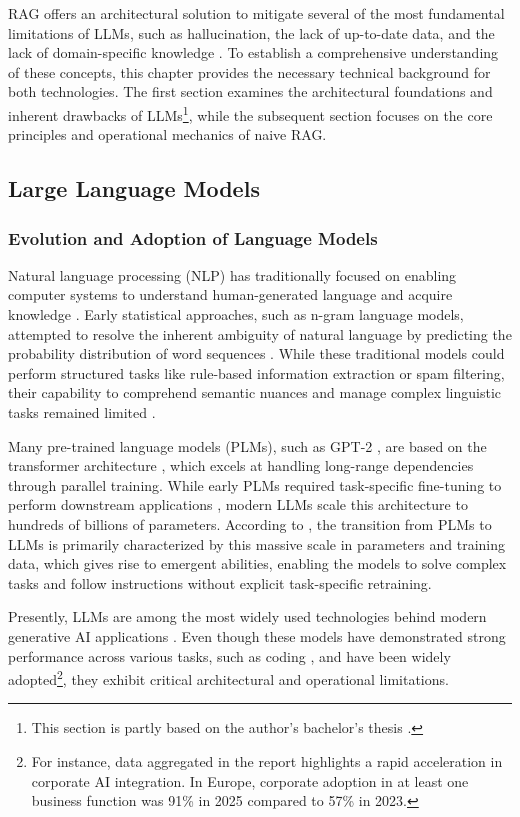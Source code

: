 RAG offers an architectural solution to mitigate several of the most fundamental limitations of LLMs, such as hallucination, the lack of up-to-date data, and the lack of domain-specific knowledge \citep{wu2025ragnlp}. To establish a comprehensive understanding of these concepts, this chapter provides the necessary technical background for both technologies. The first section examines the architectural foundations and inherent drawbacks of LLMs\footnote{This section is partly based on the author's bachelor's thesis \citep{asunmaa2025large}.}, while the subsequent section focuses on the core principles and operational mechanics of naive RAG.

\subsection{Large Language Models}
\label{chapter:LLM}

\subsubsection{Evolution and Adoption of Language Models}
Natural language processing (NLP) has traditionally focused on enabling computer systems to understand human-generated language and acquire knowledge \citep{RussellNorvig2010}. Early statistical approaches, such as n-gram language models, attempted to resolve the inherent ambiguity of natural language by predicting the probability distribution of word sequences \citep{RussellNorvig2010}. While these traditional models could perform structured tasks like rule-based information extraction or spam filtering, their capability to comprehend semantic nuances and manage complex linguistic tasks remained limited \citep{LLMSurvey}.

Many pre-trained language models (PLMs), such as GPT-2 \citep{radford2019language}, are based on the transformer architecture \citep{Vaswani2017}, which excels at handling long-range dependencies through parallel training. While early PLMs required task-specific fine-tuning to perform downstream applications \citep{bommasani2021opportunities}, modern LLMs scale this architecture to hundreds of billions of parameters. According to \citet{LLMSurvey}, the transition from PLMs to LLMs is primarily characterized by this massive scale in parameters and training data, which gives rise to emergent abilities, enabling the models to solve complex tasks and follow instructions without explicit task-specific retraining.

Presently, LLMs are among the most widely used technologies behind modern generative AI applications \citep{LLMSurvey}. Even though these models have demonstrated strong performance across various tasks, such as coding \citep{Coignion_2024}, and have been widely adopted\footnote{For instance, data aggregated in the report \citep{StanfordAIIndex2026} highlights a rapid acceleration in corporate AI integration. In Europe, corporate adoption in at least one business function was 91\% in 2025 compared to 57\% in 2023.}, they exhibit critical architectural and operational limitations. 

